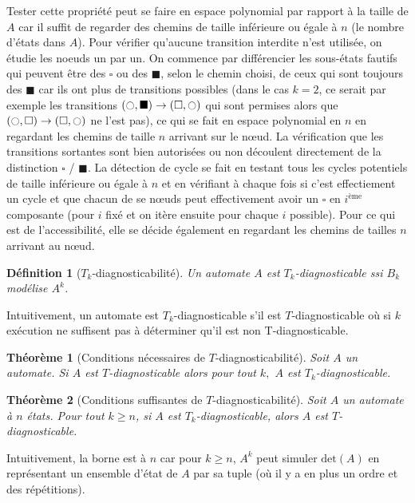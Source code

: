 \documentclass[conference]{IEEEtran}
\newtheorem{mydef}{D\'efinition}
\newtheorem{myth}{Th\'eor\`eme}
\newcommand{\es}{\square}
\newcommand{\fs}{\blacksquare}
\newcommand{\ec}{\ocircle}
\begin{document}
Tester cette propriété peut se faire en espace polynomial par rapport à la taille de $A$ car il suffit de regarder des chemins de taille inférieure ou égale à $n$ (le nombre d'états dans $A$). Pour vérifier qu'aucune transition interdite n'est utilisée, on étudie les noeuds un par un. On commence par différencier les sous-états fautifs qui peuvent être des $\es$ ou des $\fs$, selon le chemin choisi, de ceux qui sont toujours des $\fs$ car ils ont plus de transitions possibles (dans le cas $k=2$, ce serait par exemple les transitions $(\ec,\fs)\to (\es, \ec)$ qui sont permises alors que $(\ec,\es)\to (\es, \ec)$ ne l'est pas), ce qui se fait en espace polynomial en $n$ en regardant les chemins de taille $n$ arrivant sur le nœud. La vérification que les transitions sortantes sont bien autorisées ou non découlent directement de la distinction $\es$ / $\fs$. La détection de cycle se fait en testant tous les cycles potentiels de taille inférieure ou égale à $n$ et en vérifiant à chaque fois si c'est effectiement un cycle et que chacun de se nœuds peut effectivement avoir un $\es$ en $i^\text{ème}$ composante (pour $i$ fixé et on itère ensuite pour chaque $i$ possible). Pour ce qui est de l'accessibilité, elle se décide également en regardant les chemins de tailles $n$ arrivant au nœud.

\begin{mydef}[$T_k$-diagnosticabilité]
Un automate $A$ est $T_k$-diagnosticable ssi $B_k$ modélise $A^k$.
\end{mydef}

Intuitivement, un automate est $T_k$-diagnosticable s'il est $T$-diagnosticable où si $k$ exécution ne suffisent pas à déterminer qu'il est non T-diagnosticable.

\begin{myth}[Conditions nécessaires de $T$-diagnosticabilité]
Soit $A$ un automate. Si $A$ est $T$-diagnosticable alors pour tout $k,$ $A$ est $T_k$-diagnosticable.
\end{myth}

\begin{myth}[Conditions suffisantes de $T$-diagnosticabilité]
Soit $A$ un automate \`a $n$ états. Pour tout $k \ge n$, si $A$ est $T_k$-diagnosticable, alors $A$ est $T$-diagnosticable.
\end{myth}

Intuitivement, la borne est à $n$ car pour $k\ge n$, $A^k$ peut simuler $\text{det}(A)$ en représentant un ensemble d'état de $A$ par sa tuple (où il y a en plus un ordre et des répétitions). 
\end{document}
